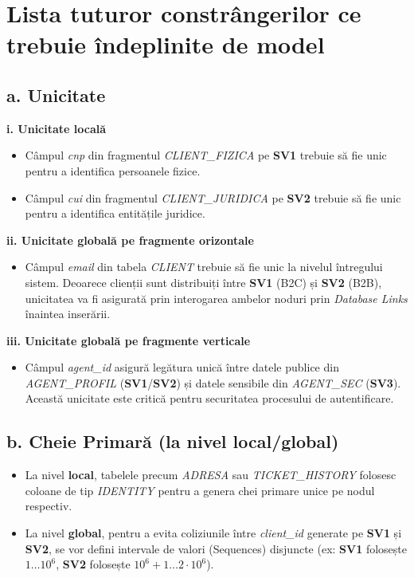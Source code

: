 \chapter{Lista tuturor constrângerilor ce trebuie îndeplinite de model}
\label{sec:constrangeri}

\section*{a. Unicitate}

\textbf{i. Unicitate locală}\\
\begin{itemize}
    \item Câmpul \textit{cnp} din fragmentul \textit{CLIENT\_FIZICA} pe \textbf{SV1} trebuie să fie unic pentru a identifica persoanele fizice.
    \item Câmpul \textit{cui} din fragmentul \textit{CLIENT\_JURIDICA} pe \textbf{SV2} trebuie să fie unic pentru a identifica entitățile juridice.
\end{itemize}

\textbf{ii. Unicitate globală pe fragmente orizontale}\\
\begin{itemize}
    \item Câmpul \textit{email} din tabela \textit{CLIENT} trebuie să fie unic la nivelul întregului sistem. Deoarece clienții sunt distribuiți între \textbf{SV1} (B2C) și \textbf{SV2} (B2B), unicitatea va fi asigurată prin interogarea ambelor noduri prin \textit{Database Links} înaintea inserării.
\end{itemize}

\textbf{iii. Unicitate globală pe fragmente verticale}\\
\begin{itemize}
    \item Câmpul \textit{agent\_id} asigură legătura unică între datele publice din \textit{AGENT\_PROFIL} (\textbf{SV1}/\textbf{SV2}) și datele sensibile din \textit{AGENT\_SEC} (\textbf{SV3}). Această unicitate este critică pentru securitatea procesului de autentificare.
\end{itemize}


\section*{b. Cheie Primară (la nivel local/global)}

\begin{itemize}
    \item La nivel \textbf{local}, tabelele precum \textit{ADRESA} sau \textit{TICKET\_HISTORY} folosesc coloane de tip \textit{IDENTITY} pentru a genera chei primare unice pe nodul respectiv.
    \item La nivel \textbf{global}, pentru a evita coliziunile între \textit{client\_id} generate pe \textbf{SV1} și \textbf{SV2}, se vor defini intervale de valori (Sequences) disjuncte (ex: \textbf{SV1} folosește $1 \dots 10^6$, \textbf{SV2} folosește $10^6+1 \dots 2 \cdot 10^6$).
\end{itemize}


